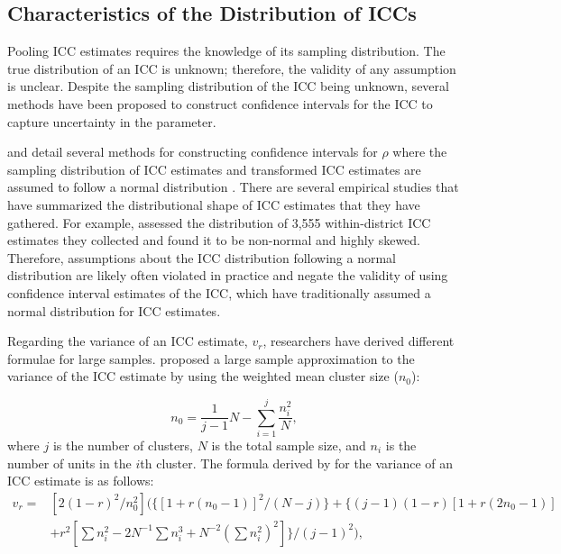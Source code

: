 \subsection{Characteristics of the Distribution of ICCs}

Pooling ICC estimates requires the knowledge of its sampling distribution. The true distribution of an ICC is unknown; therefore, the validity of any assumption is unclear. Despite the sampling distribution of the ICC being unknown, several methods have been proposed to construct confidence intervals for the ICC to capture uncertainty in the parameter. 

 and  detail several methods for constructing confidence intervals for $\rho$ where the sampling distribution of ICC estimates and transformed ICC estimates are assumed to follow a normal distribution \cite{fisherTheoryStatisticalEstimation1925, hedgesVarianceIntraclassCorrelations2012, donner1980a, smith1957, swiger1964}. There are several empirical studies that have summarized the distributional shape of ICC estimates that they have gathered. For example,  assessed the distribution of 3,555 within-district ICC estimates they collected and found it to be non-normal and highly skewed. Therefore, assumptions about the ICC distribution following a normal distribution are likely often violated in practice and negate the validity of using confidence interval estimates of the ICC, which have traditionally assumed a normal distribution for ICC estimates. 

Regarding the variance of an ICC estimate, $v_r$, researchers have derived different formulae for large samples.  proposed a large sample approximation to the variance of the ICC estimate by using the weighted mean cluster size ($n_0$):

\begin{equation}\label{weighted_mean}
n_0 = \frac{1}{j-1}N-\sum_{i=1}^j\frac{n_i^2}{N},
\end{equation}
where $j$ is the number of clusters, $N$ is the total sample size, and $n_i$ is the number of units in the $i$th cluster. The formula derived by  for the variance of an ICC estimate is as follows:
\begin{equation}\label{smith}
    \begin{split}
v_r= &[2(1-r)^2/n_0^2](\{[1+r(n_0-1)]^2/(N-j)\} + \{(j-1)(1-r)[1+r(2n_0-1)] \\
&+ r^2[\sum n_i^2 - 2N^{-1}\sum n^3_i + N^{-2}(\sum n_i^2)^2]\}/(j-1)^2),
    \end{split}
\end{equation}

